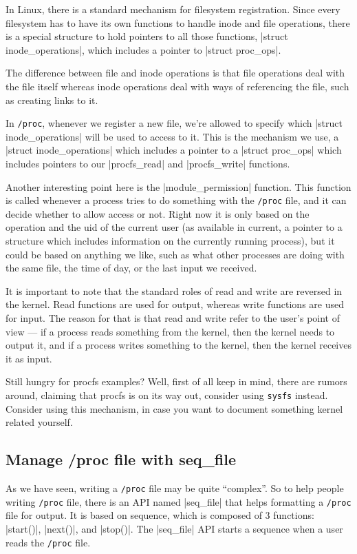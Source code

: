 \documentclass[10pt, oneside]{book}
\begin{document}
In Linux, there is a standard mechanism for filesystem registration.
Since every filesystem has to have its own functions to handle inode and file operations, there is a special structure to hold pointers to all those functions, \cpp|struct inode_operations|, which includes a pointer to \cpp|struct proc_ops|.

The difference between file and inode operations is that file operations deal with the file itself whereas inode operations deal with ways of referencing the file, such as creating links to it.

In \verb|/proc|, whenever we register a new file, we're allowed to specify which \cpp|struct inode_operations| will be used to access to it.
This is the mechanism we use, a \cpp|struct inode_operations| which includes a pointer to a \cpp|struct proc_ops| which includes pointers to our \cpp|procfs_read| and \cpp|procfs_write| functions.

Another interesting point here is the \cpp|module_permission| function.
This function is called whenever a process tries to do something with the \verb|/proc| file, and it can decide whether to allow access or not.
Right now it is only based on the operation and the uid of the current user (as available in current, a pointer to a structure which includes information on the currently running process), but it could be based on anything we like, such as what other processes are doing with the same file, the time of day, or the last input we received.

It is important to note that the standard roles of read and write are reversed in the kernel.
Read functions are used for output, whereas write functions are used for input.
The reason for that is that read and write refer to the user's point of view --- if a process reads something from the kernel, then the kernel needs to output it, and if a process writes something to the kernel, then the kernel receives it as input.


Still hungry for procfs examples?
Well, first of all keep in mind, there are rumors around, claiming that procfs is on its way out, consider using \verb|sysfs| instead.
Consider using this mechanism, in case you want to document something kernel related yourself.

\subsection{Manage /proc file with seq\_file}
\label{sec:manage_procfs_with_seq_file}
As we have seen, writing a \verb|/proc| file may be quite ``complex''.
So to help people writing \verb|/proc| file, there is an API named \cpp|seq_file| that helps formatting a \verb|/proc| file for output.
It is based on sequence, which is composed of 3 functions: \cpp|start()|, \cpp|next()|, and \cpp|stop()|.
The \cpp|seq_file| API starts a sequence when a user reads the \verb|/proc| file.
\end{document}
